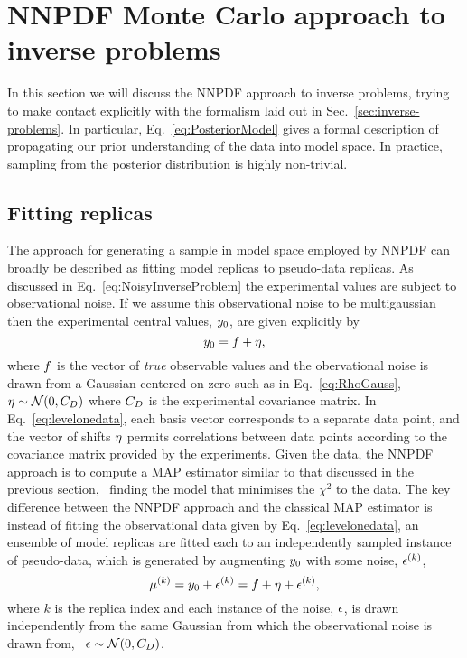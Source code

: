 \section{NNPDF Monte Carlo approach to inverse problems}
\label{sec:closure-test}

In this section we will discuss the NNPDF approach to inverse problems, trying
to make contact explicitly with the formalism laid out in
Sec.~\ref{sec:inverse-problems}. In particular, Eq.~\eqref{eq:PosteriorModel}
gives a formal description of propagating our prior understanding of the data
into model space. In practice, sampling from the posterior distribution is
highly non-trivial.

\subsection{Fitting replicas}
\label{sec:fit-reps}

The approach for generating a sample in model space employed by NNPDF can
broadly be described as fitting model replicas to pseudo-data replicas. As
discussed in Eq.~\eqref{eq:NoisyInverseProblem} the experimental values are
subject to observational noise. If we assume this observational noise to be
multigaussian then the experimental central values, $y_0$, are given
explicitly by
\begin{equation}
    \label{eq:levelonedata}
    y_0 = f + \eta,
\end{equation}
where $f$ is the vector of {\em true} observable values and the obervational
noise is drawn from a Gaussian centered on zero such as in Eq.~\ref{eq:RhoGauss},
\ie\ $\eta \sim \mathcal{N}(0, C_{D})$ where $C_{D}$ is the
experimental covariance matrix. In
Eq.~\eqref{eq:levelonedata}, each basis vector corresponds to a separate data
point, and the vector of shifts $\eta$ permits correlations between data
points according to the covariance matrix provided by the experiments. Given the
data, the NNPDF approach is to compute a MAP estimator similar to that discussed
in the previous section, \ie\ finding the model that minimises the $\chi^2$ to the
data. The key difference between the NNPDF approach and the classical MAP estimator
is instead of fitting the observational data given by Eq.~\ref{eq:levelonedata},
an ensemble of model replicas are fitted each to an independently sampled
instance of pseudo-data, which is generated by augmenting $y_0$ with some
noise, $\epsilon^{(k)}$,
\begin{equation}
    \label{eq:leveltwodata1}
    \mu^{(k)} = y_0 + \epsilon^{(k)}
    = f + \eta + \epsilon^{(k)},
\end{equation}
where $k$ is the replica index and each instance of the noise, $\epsilon$, is drawn
independently from the same Gaussian from which the observational noise is
drawn from, \ie\ $\epsilon \sim \mathcal{N}(0, C_{D})$.

